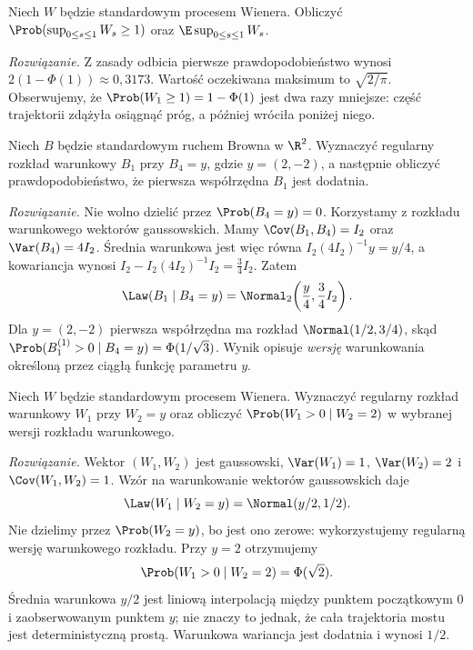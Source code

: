 \begin{zadanie}
Niech $W$ będzie standardowym procesem Wienera.
Obliczyć $\Prob(\sup_{0\le s\le1}W_s\ge1)$ oraz
$\E\sup_{0\le s\le1}W_s$.

\emph{Rozwiązanie.} Z zasady odbicia pierwsze
prawdopodobieństwo wynosi $2(1-\Phi(1))\approx0{,}3173$.
Wartość oczekiwana maksimum to $\sqrt{2/\pi}$.
Obserwujemy, że $\Prob(W_1\ge1)=1-\Phi(1)$ jest dwa razy
mniejsze: część trajektorii zdążyła osiągnąć próg,
a później wróciła poniżej niego.
\end{zadanie}


\begin{zadanie}
Niech $B$ będzie standardowym ruchem Browna w $\R^2$.
Wyznaczyć regularny rozkład warunkowy $B_1$ przy $B_4=y$,
gdzie $y=(2,-2)$, a następnie obliczyć prawdopodobieństwo,
że pierwsza współrzędna $B_1$ jest dodatnia.

\emph{Rozwiązanie.} Nie wolno dzielić przez $\Prob(B_4=y)=0$.
Korzystamy z rozkładu warunkowego wektorów gaussowskich.
Mamy $\Cov(B_1,B_4)=I_2$ oraz $\Var(B_4)=4I_2$.
Średnia warunkowa jest więc równa $I_2(4I_2)^{-1}y=y/4$,
a kowariancja wynosi
$I_2-I_2(4I_2)^{-1}I_2=\tfrac34 I_2$.
Zatem
\[
\Law(B_1\mid B_4=y)=\Normal_2\!\left(\frac{y}{4},\frac34 I_2\right).
\]
Dla $y=(2,-2)$ pierwsza współrzędna ma rozkład
$\Normal(1/2,3/4)$, skąd
$\Prob(B_1^{(1)}>0\mid B_4=y)=\Phi(1/\sqrt3)$.
Wynik opisuje \emph{wersję} warunkowania określoną
przez ciągłą funkcję parametru $y$.
\end{zadanie}

\begin{zadanie}
Niech $W$ będzie standardowym procesem Wienera. Wyznaczyć
regularny rozkład warunkowy $W_1$ przy $W_2=y$ oraz
obliczyć $\Prob(W_1>0\mid W_2=2)$ w wybranej wersji
rozkładu warunkowego.

\emph{Rozwiązanie.} Wektor $(W_1,W_2)$ jest gaussowski,
$\Var(W_1)=1$, $\Var(W_2)=2$ i
$\Cov(W_1,W_2)=1$. Wzór na warunkowanie wektorów
gaussowskich daje
\[
\Law(W_1\mid W_2=y)=\Normal(y/2,1/2).
\]
Nie dzielimy przez $\Prob(W_2=y)$, bo jest ono zerowe:
wykorzystujemy regularną wersję warunkowego rozkładu.
Przy $y=2$ otrzymujemy
\[
\Prob(W_1>0\mid W_2=2)=\Phi(\sqrt 2).
\]
Średnia warunkowa $y/2$ jest liniową interpolacją
między punktem początkowym $0$ i zaobserwowanym punktem
$y$; nie znaczy to jednak, że cała trajektoria mostu
jest deterministyczną prostą. Warunkowa wariancja jest
dodatnia i wynosi $1/2$.
\end{zadanie}

